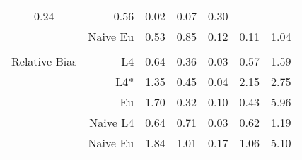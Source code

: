 \documentclass[a4paper,12pt,twoside]{book}
\begin{document}
\begin{table}[H]
\begin{tabular}{crrrrrr}
0.24 & 0.56 & 0.02 & 0.07 & 0.30 \\ 
   
&Naive Eu &  0.53 & 0.85 & 0.12 & 0.11 & 1.04 \\ 
  
  
   \\

   \hline
   
{\color{blue} Relative Bias } & L4  &0.64 & 0.36 & 0.03 & 0.57 & 1.59 \\ 
  
&L4*  & 1.35 & 0.45 & 0.04 & 2.15 & 2.75 \\ 
  
  
&Eu &  
 1.70 & 0.32 & 0.10 & 0.43 & 5.96 \\ 
 
&Naive L4&  
  0.64 & 0.71 & 0.03 & 0.62 & 1.19 \\ 

  
&Naive Eu &  
     1.84 & 1.01 & 0.17 & 1.06 & 5.10 \\ 
  
\end{tabular}

\end{table}
\end{document}
